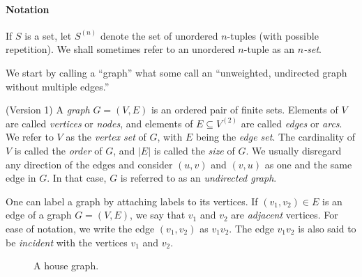 \paragraph{Notation}
If $S$ is a set, let $S^{(n)}$ denote the set of unordered $n$-tuples
(with possible repetition). We shall sometimes refer to an unordered
$n$-tuple as an \emph{$n$-set}.

We start by calling a ``graph'' what some call an
``unweighted,
undirected graph without
multiple edges.''

\begin{definition}
(Version 1)
{\rm
A \emph{graph} $G = (V, E)$ is an ordered pair of finite
sets. Elements of $V$ are called \emph{vertices} or
\emph{nodes}, and elements of $E \subseteq V^{(2)}$ are
called \emph{edges} or \emph{arcs}. We refer
to $V$ as the \emph{vertex set} of $G$, with $E$
being the \emph{edge set}. The cardinality of $V$ is
called the \emph{order} of $G$, and $|E|$ is called the
\emph{size} of $G$. We usually disregard any direction of
the edges and consider $(u,v)$ and $(v,u)$ as one and the same edge in
$G$. In that case, $G$ is referred to as an
\emph{undirected graph}.
}
\end{definition}

One can label a graph by attaching labels to its vertices.
If $(v_1, v_2) \in E$ is an edge of a graph $G = (V, E)$, we say that $v_1$ and
$v_2$ are \emph{adjacent} vertices. For ease of notation, we write the
edge $(v_1, v_2)$ as $v_1 v_2$. The edge $v_1 v_2$ is also said to be
\emph{incident} with the vertices $v_1$ and $v_2$.

\begin{figure}[!htbp]
\centering

\caption{A house graph.}
\label{fig:introduction:house_graph}
\end{figure}

